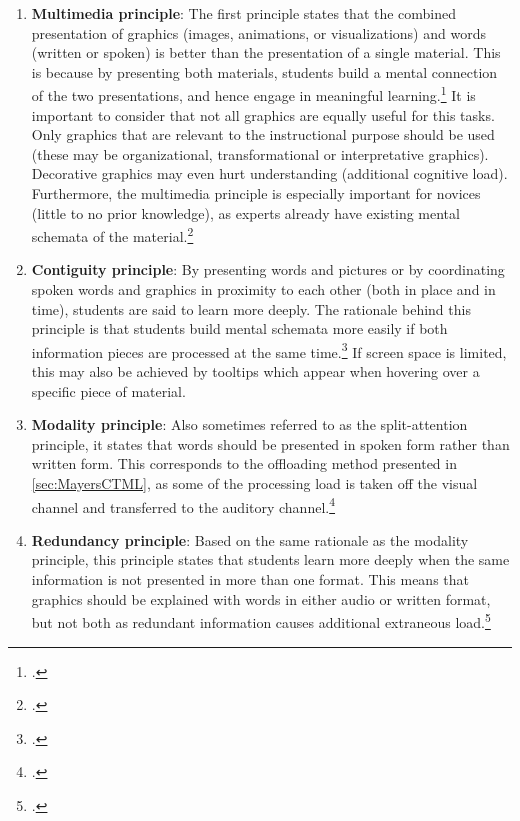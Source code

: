 \begin{enumerate}
    \item \textbf{Multimedia principle}: The first principle states that the combined presentation of graphics (images, animations, or visualizations) and words (written or spoken) is better than the presentation of a single material. This is because by presenting both materials, students build a mental connection of the two presentations, and hence engage in meaningful learning.\footcites[Cf.][p.19]{MayerAnimationAidMultimedia2001}[cf.][chapter 4, paragraph 7]{ClarkElearningscienceinstruction2016}[cf.][p.13]{MayerCognitiveTheoryMultimedia1999} It is important to consider that not all graphics are equally useful for this tasks. Only graphics that are relevant to the instructional purpose should be used (these may be organizational, transformational or interpretative graphics). Decorative graphics may even hurt understanding (additional cognitive load). Furthermore, the multimedia principle is especially important for novices (little to no prior knowledge), as experts already have existing mental schemata of the material.\footcites[Cf.][chapter 4, paragraphs 7 et seq]{ClarkElearningscienceinstruction2016}[cf. in addition][]{MayerWhenillustrationworth1990}
    \item \textbf{Contiguity principle}: By presenting words and pictures or by coordinating spoken words and graphics in proximity to each other (both in place and in time), students are said to learn more deeply. The rationale behind this principle is that students build mental schemata more easily if both information pieces are processed at the same time.\footcites[Cf.][p. 19 et seqq]{MayerAnimationAidMultimedia2001}[cf.][chapter 5, paragraphs 1 et seq]{ClarkElearningscienceinstruction2016} If screen space is limited, this may also be achieved by tooltips which appear when hovering over a specific piece of material.
    \item \textbf{Modality principle}: Also sometimes referred to as the split-attention principle, it states that words should be presented in spoken form rather than written form. This corresponds to the offloading method presented in \ref{sec:MayersCTML}, as some of the processing load is taken off the visual channel and transferred to the auditory channel.\footcites[Cf.][p.22]{MayerAnimationAidMultimedia2001}[cf.][p.14]{MayerCognitiveTheoryMultimedia1999}
    \item \textbf{Redundancy principle}: Based on the same rationale as the modality principle, this principle states that students learn more deeply when the same information is not presented in more than one format. This means that graphics should be explained with words in either audio or written format, but not both as redundant information causes additional extraneous load.\footcites[Cf.][chapters 6 and 7]{ClarkElearningscienceinstruction2016}[cf.][p.6]{MayerMultimediaLearning2009}[cf.][p.22]{MayerAnimationAidMultimedia2001}[cf. in addition][]{MayerPrinciplesreducingextraneous2014}

\end{enumerate}
